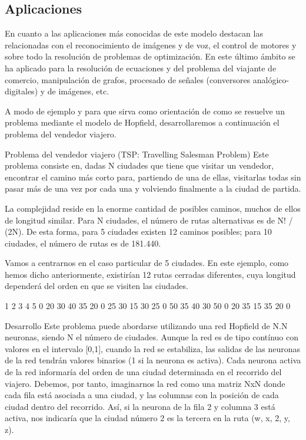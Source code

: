 \documentclass[letterpaper,12pt]{article}
\begin{document}
\subsection{Aplicaciones}
En cuanto a las aplicaciones más conocidas de este modelo destacan las relacionadas con el reconocimiento de imágenes y de voz, el control de motores y sobre todo la resolución de problemas de optimización. En este último ámbito se ha aplicado para la resolución de ecuaciones y del problema del viajante de comercio, manipulación de grafos, procesado de señales (conversores analógico-digitales) y de imágenes, etc.

A modo de ejemplo y para que sirva como orientación de como se resuelve un problema mediante el modelo de Hopfield, desarrollaremos a continuación el problema del vendedor viajero.

Problema del vendedor viajero (TSP: Travelling Salesman Problem)
Este problema consiste en, dadas N ciudades que tiene que visitar un vendedor, encontrar el camino más corto para, partiendo de una de ellas, visitarlas todas sin pasar más de una vez por cada una y volviendo finalmente a la ciudad de partida.

La complejidad reside en la enorme cantidad de posibles caminos, muchos de ellos de longitud similar. Para N ciudades, el número de rutas alternativas es de N! / (2N). De esta forma, para 5 ciudades existen 12 caminos posibles; para 10 ciudades, el número de rutas es de 181.440.

Vamos a centrarnos en el caso particular de 5 ciudades. En este ejemplo, como hemos dicho anteriormente, existirían 12 rutas cerradas diferentes, cuya longitud dependerá del orden en que se visiten las ciudades.

 	\begin{center}
 	    
        1   2   3   4   5   0   20  30  40  35   20  0   25  30  15   30  25  0   50  35   40  30  50  0   20   35  15  35  20  0\newline
 	\end{center}


Desarrollo\newline
Este problema puede abordarse utilizando una red Hopfield de N.N neuronas, siendo N el número de ciudades. Aunque la red es de tipo contínuo con valores en el intervalo [0,1], cuando la red se estabiliza, las salidas de las neuronas de la red tendrán valores binarios (1 si la neurona es activa). Cada neurona activa de la red informaría del orden de una ciudad determinada en el recorrido del viajero. Debemos, por tanto, imaginarnos la red como una matriz NxN donde cada fila está asociada a una ciudad, y las columnas con la posición de cada ciudad dentro del recorrido. Así, si la neurona de la fila 2 y columna 3 está activa, nos indicaría que la ciudad número 2 es la tercera en la ruta (w, x, 2, y, z).
\end{document}
